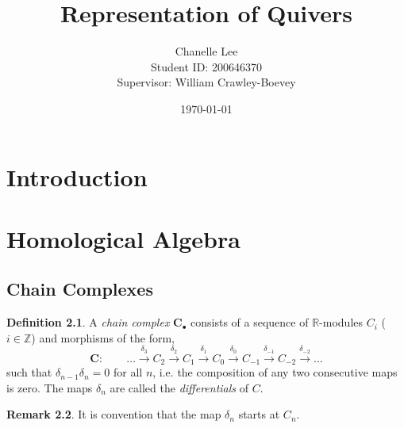 \documentclass[11.5pt, twoside, a4paper, titlepage]{report}
\theoremstyle{definition}
\newtheorem{mydef}{Definition}[section]
\newtheorem{rem}[mydef]{Remark}
\theoremstyle{plain}
\begin{document}
\title{Representation of Quivers}
\author{Chanelle Lee \\Student ID: 200646370\\Supervisor: William Crawley-Boevey}
\date{\today}
\maketitle


\tableofcontents

\chapter{Introduction}

\chapter{Homological Algebra}
\section{Chain Complexes}

\begin{mydef}
A \emph{chain complex} $\mathbf{C}_{\bullet}$ consists of a sequence of $\mathbb{R}$-modules $C_i$ ($i \in \mathbb{Z}$) and morphisms of the form,
\begin{equation*}
\mathbf{C}: \qquad \dots \xrightarrow{\delta_{3}} C_2 \xrightarrow{\delta_{2}} C_1 \xrightarrow{\delta_{1 }} C_0 \xrightarrow{\delta_0} C_{-1} \xrightarrow{\delta_{-1}} C_{-2} \xrightarrow{\delta_{-2}}\dots
\end{equation*}
such that $\delta_{n-1}\delta_{n}=0$ for all $n$, i.e. the composition of any two consecutive maps is zero. The maps $\delta_n$ are called the \emph{differentials} of $C$.
\end{mydef}

\begin{rem}
It is convention that the map $\delta_n$ starts at $C_n$.
\end{rem}
\end{document}
